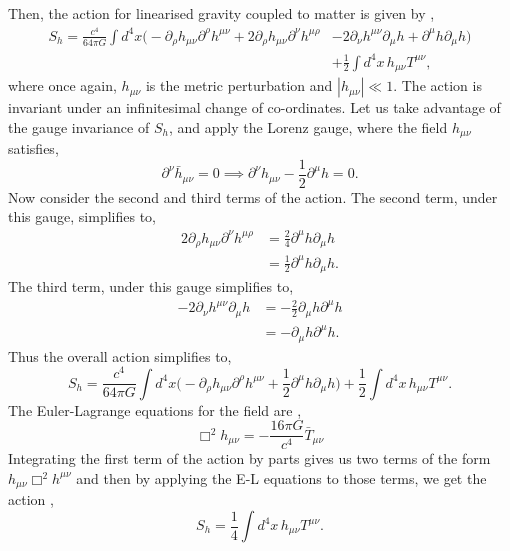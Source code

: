 \documentclass[12pt,a4paper]{report}
\theoremstyle{plain}
\theoremstyle{definition}
\theoremstyle{remark}
\newcommand{\munu}{\mu\nu}
\begin{document}
Then, the action for linearised gravity coupled to matter is given by \cite{gravact1, carroll_2019},
\begin{equation}
\begin{aligned}
	S_{h} = \frac{c^4}{64 \pi G} \int d^4 x \Big(-\partial_{\rho} h_{\mu \nu} \partial^{\rho} h^{\mu \nu} + 2 \partial_{\rho} h_{\mu \nu} \partial^{\nu} h^{\mu \rho} 
	&- 2 \partial_{\nu} h^{\mu \nu} \partial_{\mu} h + \partial^{\mu} h \partial_{\mu} h \Big) \\
	&+ \frac{1}{2} \int d^4 x \,h_{\mu \nu} T^{\mu \nu},
\end{aligned}
\end{equation}
where once again, $h_{\munu}$ is the metric perturbation and $|h_{\munu}| \ll 1$. The action is invariant under an infinitesimal change of co-ordinates. Let us take advantage of the gauge invariance of $S_h$, and apply the Lorenz gauge, where the field $h_{\munu}$ satisfies,
\begin{equation}
    \partial^{\nu}\bar{h}_{\munu} = 0 \implies \partial^{\nu}h_{\munu} - \frac{1}{2}\partial^{\mu}h = 0.
\end{equation}
Now consider the second and third terms of the action. The second term, under this gauge, simplifies to,
\begin{equation}
    \begin{aligned}
        2 \partial_{\rho} h_{\mu \nu} \partial^{\nu} h^{\mu \rho} &= \frac{2}{4} \partial^{\mu}h\partial_{\mu}h \\
        &= \frac{1}{2} \partial^{\mu}h\partial_{\mu}h.
    \end{aligned}
\end{equation}
The third term, under this gauge simplifies to,
\begin{equation}
    \begin{aligned}
        - 2 \partial_{\nu} h^{\mu \nu} \partial_{\mu} h &= -\frac{2}{2}\partial_{\mu}h\partial^{\mu}h\\
        &= -\partial_{\mu}h\partial^{\mu}h.
    \end{aligned}
\end{equation}
Thus the overall action simplifies to,
\begin{equation}
	S_{h} = \frac{c^4}{64 \pi G} \int d^4 x \Big(-\partial_{\rho} h_{\mu \nu} \partial^{\rho} h^{\mu \nu} + \frac{1}{2} \partial^{\mu}h\partial_{\mu}h \Big)  + \frac{1}{2} \int d^4 x \,h_{\mu \nu} T^{\mu \nu}.
\end{equation}
The Euler-Lagrange equations for the field are \cite{weinberg, Flanagan_2005, poisson_will_2014},
\begin{equation}
    \Box^2h_{\munu} = -\frac{16\pi G}{c^4}\bar{T}_{\munu}
\end{equation}
Integrating the first term of the action by parts gives us two terms of the form $h_{\munu}\Box^2h^{\munu}$ and then by applying the E-L equations to those terms, we get the action \cite{Christodoulou_2023b},
\begin{equation} \label{eq: CovarAct}
    S_h =  \frac{1}{4} \int d^4x \,h_{\mu \nu} T^{\mu \nu}.
\end{equation}
\end{document}
